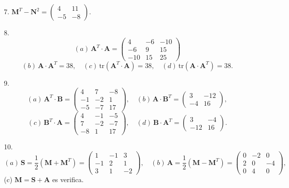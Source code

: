 \documentclass[12pt]{article}
\newcommand{\mat}[1]{\mathbf{#1}}
\begin{document}
\begin{exercici}
7. $\mat{M}^T - \mat{N}^2 = 
\begin{pmatrix}
4 & 11 \\
-5 & -8
\end{pmatrix}$.
\end{exercici}

\begin{exercici}
8. 
\[
(a) \, \mat{A}^T \cdot \mat{A} = 
\begin{pmatrix}
4 & -6 & -10 \\
-6 & 9 & 15 \\
-10 & 15 & 25
\end{pmatrix}
\]
\[
(b) \, \mat{A} \cdot \mat{A}^T = 38, \quad 
(c) \, \text{tr}(\mat{A}^T \cdot \mat{A}) = 38, \quad 
(d) \, \text{tr}(\mat{A} \cdot \mat{A}^T) = 38.
\]
\end{exercici}

\begin{exercici}
9. 
\[
(a) \, \mat{A}^T \cdot \mat{B} = 
\begin{pmatrix}
4 & 7 & -8 \\
-1 & -2 & 1 \\
-5 & -7 & 17
\end{pmatrix}, \quad 
(b) \, \mat{A} \cdot \mat{B}^T = 
\begin{pmatrix}
3 & -12 \\
-4 & 16
\end{pmatrix},
\]
\[
(c) \, \mat{B}^T \cdot \mat{A} = 
\begin{pmatrix}
4 & -1 & -5 \\
7 & -2 & -7 \\
-8 & 1 & 17
\end{pmatrix}, \quad 
(d) \, \mat{B} \cdot \mat{A}^T = 
\begin{pmatrix}
3 & -4 \\
-12 & 16
\end{pmatrix}.
\]
\end{exercici}

\begin{exercici}
10. 
\[
(a) \, \mat{S} = 
\frac{1}{2} (\mat{M} + \mat{M}^T) = 
\begin{pmatrix}
1 & -1 & 3 \\
-1 & 2 & 1 \\
3 & 1 & -2
\end{pmatrix}, \quad 
(b) \, \mat{A} = 
\frac{1}{2} (\mat{M} - \mat{M}^T) = 
\begin{pmatrix}
0 & -2 & 0 \\
2 & 0 & -4 \\
0 & 4 & 0
\end{pmatrix},
\]
(c) $\mat{M} = \mat{S} + \mat{A}$ es verifica.
\end{exercici}
\end{document}
